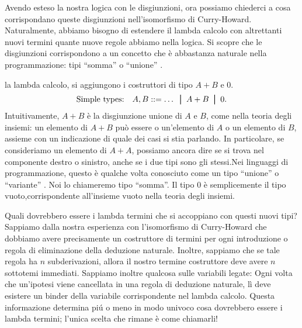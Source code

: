 \documentclass{article}
\begin{document}
Avendo esteso la nostra logica con le disgiunzioni, ora possiamo chiederci
a cosa  corrispondano queste disgiunzioni nell'isomorfismo di Curry-Howard.
Naturalmente, abbiamo bisogno di estendere il lambda calcolo con altrettanti
nuovi termini quante nuove regole abbiamo  nella logica. Si scopre che le
disgiunzioni corrispondono a un concetto che \`e abbastanza naturale nella
programmazione: tipi ``somma'' o ``unione'' . 

la lambda calcolo, si aggiungono i costruttori di tipo $A+B$ e $0$.
\[ \mbox{Simple types:}\ssep A,B \bnf \ldots\bor A+B\bor 0.
\]
Intuitivamente, $A+B$ \`e la disgiunzione unione di $A$ e $B$, come nella teoria
degli insiemi: un elemento di $A+B$ pu\`o essere o un'elemento di $A$ o un elemento
di $B$, assieme con un indicazione di quale dei casi si stia parlando. In
particolare, se consideriamo un elemento di $A+A$, possiamo ancora dire se
si trova nel componente destro o sinistro, anche se i due
tipi sono gli stessi.Nei linguaggi di programmazione, questo \`e qualche volta conosciuto
come un tipo ``unione'' o ``variante'' . Noi lo chiameremo tipo ``somma''.
Il tipo  $0$ \`e semplicemente il tipo vuoto,corrispondente all'insieme vuoto
nella teoria degli insiemi.

Quali dovrebbero essere i lambda termini che si accoppiano con questi nuovi tipi?  Sappiamo
dalla nostra esperienza con l'isomorfismo di Curry-Howard che dobbiamo
avere precisamente un costruttore di termini per ogni introduzione o
regola di eliminazione della deduzione naturale. Inoltre, sappiamo che se tale
regola ha $n$ subderivazioni, allora il nostro termine costruttore deve avere
$n$ sottotemi immediati. Sappiamo inoltre qualcosa sulle variabili legate:
Ogni volta che un'ipotesi viene cancellata in una regola di deduzione naturale, l\`i
deve esistere un binder della variabile corrispondente nel lambda calcolo.
Questa informazione determina pi\'u o meno in modo univoco cosa dovrebbero essere i lambda
termini; l'unica scelta che rimane \`e come chiamarli!
\end{document}
